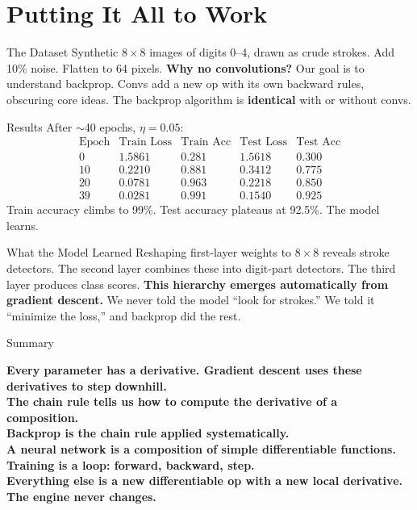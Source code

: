 \documentclass[10pt]{beamer}
\begin{document}
\section{Putting It All to Work}

\begin{frame}{The Dataset}
    Synthetic $8 \times 8$ images of digits 0--4, drawn as crude strokes. Add 10\% noise. Flatten to 64 pixels.
    \vspace{0.5cm}
    \textbf{Why no convolutions?} Our goal is to understand backprop. Convs add a new op with its own backward rules, obscuring core ideas. The backprop algorithm is \textbf{identical} with or without convs.
\end{frame}

\begin{frame}{Results}
    After $\sim$40 epochs, $\eta = 0.05$:
    \[
        \begin{array}{c|c|c|c|c}
            \text{Epoch} & \text{Train Loss} & \text{Train Acc} & \text{Test Loss} & \text{Test Acc} \\
            \hline
            0  & 1.5861 & 0.281 & 1.5618 & 0.300 \\
            10 & 0.2210 & 0.881 & 0.3412 & 0.775 \\
            20 & 0.0781 & 0.963 & 0.2218 & 0.850 \\
            39 & 0.0281 & 0.991 & 0.1540 & 0.925
        \end{array}
    \]
    Train accuracy climbs to 99\%. Test accuracy plateaus at 92.5\%. The model learns.
\end{frame}

\begin{frame}{What the Model Learned}
    Reshaping first-layer weights to $8 \times 8$ reveals stroke detectors. The second layer combines these into digit-part detectors. The third layer produces class scores.
    \vspace{0.5cm}
    \textbf{This hierarchy emerges automatically from gradient descent.} We never told the model ``look for strokes.'' We told it ``minimize the loss,'' and backprop did the rest.
\end{frame}

\begin{frame}{Summary}
    \begin{center}
        \textbf{Every parameter has a derivative. Gradient descent uses these derivatives to step downhill.\\
        The chain rule tells us how to compute the derivative of a composition.\\
        Backprop is the chain rule applied systematically.\\
        A neural network is a composition of simple differentiable functions.\\
        Training is a loop: forward, backward, step.\\
        Everything else is a new differentiable op with a new local derivative.\\
        The engine never changes.}
    \end{center}
\end{frame}
\end{document}

